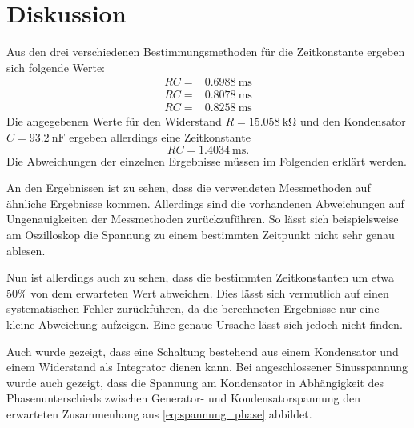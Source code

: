 \section{Diskussion}
\label{sec:Diskussion}


Aus den drei verschiedenen Bestimmungsmethoden für die Zeitkonstante ergeben sich folgende Werte:
\begin{align}
    RC =& \SI{0.6988}{\milli\second} \\
    RC =& \SI{0.8078}{\milli\second} \\
    RC =& \SI{0.8258}{\milli\second}
\end{align}
Die angegebenen Werte für den Widerstand $R=\SI{15.058}{\kilo\ohm}$ und den Kondensator $C=\SI{93.2}{\nano\farad}$ ergeben allerdings eine Zeitkonstante
\begin{equation}
    RC = \SI{1.4034}{\milli\second}.
\end{equation}
Die Abweichungen der einzelnen Ergebnisse müssen im Folgenden erklärt werden.

An den Ergebnissen ist zu sehen, dass die verwendeten Messmethoden auf ähnliche Ergebnisse kommen.
Allerdings sind die vorhandenen Abweichungen auf Ungenauigkeiten der Messmethoden zurückzuführen. So lässt sich beispielsweise am Oszilloskop die Spannung zu einem bestimmten Zeitpunkt nicht sehr genau ablesen. 

Nun ist allerdings auch zu sehen, dass die bestimmten Zeitkonstanten um etwa 50\% von dem erwarteten Wert abweichen. Dies lässt sich vermutlich auf einen systematischen Fehler zurückführen, da die berechneten Ergebnisse nur eine kleine Abweichung aufzeigen. Eine genaue Ursache lässt sich jedoch nicht finden.

Auch wurde gezeigt, dass eine Schaltung bestehend aus einem Kondensator und einem Widerstand als Integrator dienen kann. Bei angeschlossener Sinusspannung wurde auch gezeigt, dass die Spannung am Kondensator in Abhängigkeit des Phasenunterschieds zwischen Generator- und Kondensatorspannung den erwarteten Zusammenhang aus \autoref{eq:spannung_phase} abbildet.